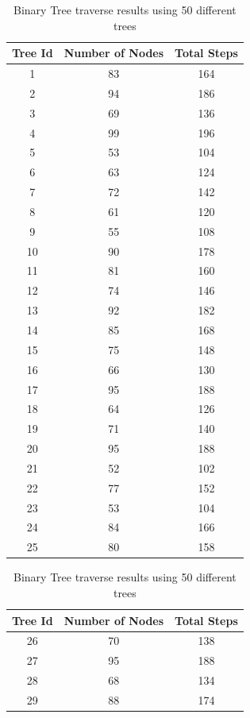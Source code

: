\documentclass[12p]{article}
\begin{document}
\footnotesize
\begin{table}[ht]
\caption{Binary Tree traverse results using 50 different trees}	%
\begin{tabular}{c c c} 							%
\hline\hline 									%
Tree Id & Number of Nodes & Total Steps\\ [0.5ex] 			%
\hline %
1 & 83 & 164 \\ 								%
2 & 94 & 186 \\
3 & 69 & 136 \\
4 & 99 & 196 \\
5 & 53 & 104 \\
6 & 63 & 124 \\
7 & 72 & 142 \\
8 & 61 & 120 \\
9 & 55 & 108 \\
10 & 90 & 178 \\
11 & 81 & 160 \\
12 & 74 & 146 \\
13 & 92 & 182 \\
14 & 85 & 168 \\
15 & 75 & 148 \\
16 & 66 & 130 \\
17 & 95 & 188 \\
18 & 64 & 126 \\
19 & 71 & 140 \\
20 & 95 & 188 \\
21 & 52 & 102 \\
22 & 77 & 152 \\
23 & 53 & 104 \\
24 & 84 & 166 \\
25 & 80 & 158 \\
\hline %
\end{tabular}
\qquad
\begin{tabular}{c c c} 							%
\hline\hline 									%
Tree Id & Number of Nodes & Total Steps\\ [0.5ex] 			%
\hline %
26 & 70 & 138 \\
27 & 95 & 188 \\
28 & 68 & 134 \\
29 & 88 & 174 \\

\end{tabular}
\end{table}
\end{document}
